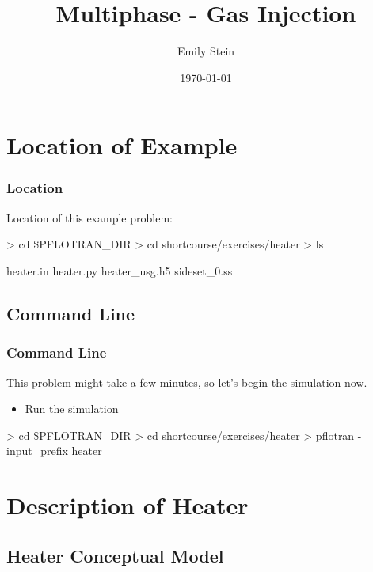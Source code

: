 \documentclass{beamer}
\begin{document}
\title{Multiphase - Gas Injection}
\author{Emily Stein}
\date{\today}


\section{Location of Example}

\begin{frame}\frametitle{Location}

Location of this example problem:

\begin{semiverbatim}
> cd \$PFLOTRAN_DIR
> cd shortcourse/exercises/heater
> ls

heater.in
heater.py
heater_usg.h5
sideset_0.ss
\end{semiverbatim}

\end{frame}

\subsection{Command Line}
\begin{frame}[fragile]\frametitle{Command Line}
This problem might take a few minutes, so let's begin the simulation now.

\begin{itemize}
  \item Run the simulation
\end{itemize}

\begin{semiverbatim}
> cd \$PFLOTRAN_DIR
> cd shortcourse/exercises/heater
> pflotran -input_prefix heater
\end{semiverbatim}

\end{frame}

\section{Description of Heater}

\subsection{Heater Conceptual Model}
\end{document}
